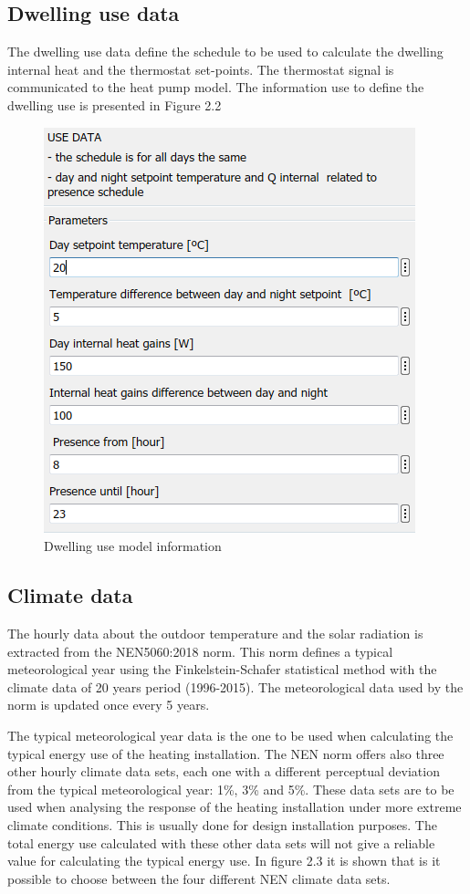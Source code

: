 \subsection{Dwelling use data}

The dwelling use data define the schedule to be used to calculate the dwelling internal heat and the thermostat set-points. The thermostat signal is communicated to the heat pump model. The information use to define the dwelling use is presented in Figure 2.2
\\
\begin{figure}[H]
	\centering
	\includegraphics[width=0.8\columnwidth]{Pictures/Dwelling use model information.png}
	\caption[Short title]{Dwelling use model information}
	\label{figure:Dwelling info}
\end{figure}
\newpage
\subsection{Climate data}

The hourly data about the outdoor temperature and the solar radiation is extracted from the NEN5060:2018 norm. This norm defines a typical meteorological year using the Finkelstein-Schafer statistical method with the climate data of 20 years period (1996-2015). The meteorological data used by the norm is updated once every 5 years.  

The typical meteorological year data is the one to be used when calculating the typical energy use of the heating installation. The NEN norm offers also three other hourly climate data sets, each one with a different perceptual deviation from the typical meteorological year: 1\%, 3\% and 5\%. These data sets are to be used when analysing the response of the heating installation under more extreme climate conditions. This is usually done for design installation purposes. The total energy use calculated with these other data sets will not give a reliable value for calculating the typical energy use.  In figure 2.3 it is shown that is it possible to choose between the four different NEN climate data sets. 

